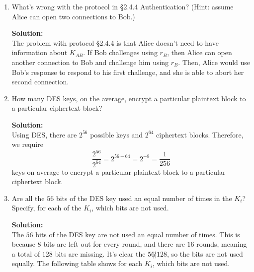 \documentclass[11pt]{article}
\begin{document}
\begin{enumerate}[1)]
\item What's wrong with the protocol in §2.4.4 Authentication? (Hint: assume Alice can open two connections to Bob.)

\textbf{Solution: } \\
The problem with protocol §2.4.4 is that Alice doesn't need to have information about $K_{AB}$.  If Bob challenges using $r_B$, then Alice can open another connection to Bob and challenge him using $r_B$.  Then, Alice would use Bob's response to respond to his first challenge, and she is able to abort her second connection.  

\item How many DES keys, on the average, encrypt a particular plaintext block to a particular ciphertext block?

\textbf{Solution: } \\
Using DES, there are $2^{56}$ possible keys and $2^{64}$ ciphertext blocks.  Therefore, we require 
$$\dfrac{2^{56}}{2^{64}} = 2^{56-64} = 2^{-8} = \dfrac{1}{256}$$
keys on average to encrypt a particular plaintext block to a particular ciphertext block.  

\newpage

\item Are all the $56$ bits of the DES key used an equal number of times in the $K_i$? Specify, for each of the $K_i$, which bits are not used.

\textbf{Solution: } \\
The $56$ bits of the DES key are not used an equal number of times.  This is because $8$ bits are left out for every round, and there are $16$ rounds, meaning a total of $128$ bits are missing.  It's clear the $56 \not| 128$, so the bits are not used equally.  The following table shows for each $K_i$, which bits are not used.  


\end{enumerate}
\end{document}
